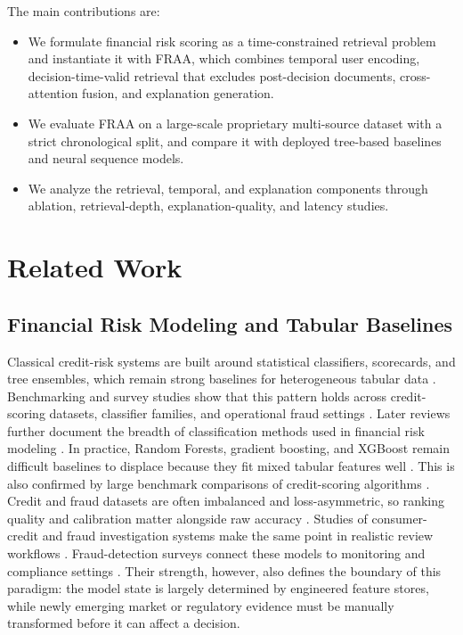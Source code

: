 \documentclass[runningheads]{llncs}
\begin{document}
The main contributions are:
\begin{itemize}
\setlength{\itemsep}{1pt}
\setlength{\topsep}{4pt}
\setlength{\parsep}{0pt}
\setlength{\partopsep}{0pt}
\item[\textendash] We formulate financial risk scoring as a time-constrained retrieval problem and instantiate it with FRAA, which combines temporal user encoding, decision-time-valid retrieval that excludes post-decision documents, cross-attention fusion, and explanation generation.
\item[\textendash] We evaluate FRAA on a large-scale proprietary multi-source dataset with a strict chronological split, and compare it with deployed tree-based baselines and neural sequence models.
\item[\textendash] We analyze the retrieval, temporal, and explanation components through ablation, retrieval-depth, explanation-quality, and latency studies.
\end{itemize}

\section{Related Work}

\subsection{Financial Risk Modeling and Tabular Baselines}
Classical credit-risk systems are built around statistical classifiers, scorecards, and tree ensembles, which remain strong baselines for heterogeneous tabular data \cite{hand1997statistical,thomas2000survey}. Benchmarking and survey studies show that this pattern holds across credit-scoring datasets, classifier families, and operational fraud settings \cite{baesens2003benchmarking,abdou2011credit}. Later reviews further document the breadth of classification methods used in financial risk modeling \cite{louzada2016classification}. In practice, Random Forests, gradient boosting, and XGBoost remain difficult baselines to displace because they fit mixed tabular features well \cite{breiman2001random,friedman2001greedy}. This is also confirmed by large benchmark comparisons of credit-scoring algorithms \cite{chen2016xgboost,lessmann2015benchmarking}. Credit and fraud datasets are often imbalanced and loss-asymmetric, so ranking quality and calibration matter alongside raw accuracy \cite{crook2007recent,brown2012experimental}. Studies of consumer-credit and fraud investigation systems make the same point in realistic review workflows \cite{khandani2010consumer,bellotti2009support}. Fraud-detection surveys connect these models to monitoring and compliance settings \cite{bolton2002statistical,ngai2011application}. Their strength, however, also defines the boundary of this paradigm: the model state is largely determined by engineered feature stores, while newly emerging market or regulatory evidence must be manually transformed before it can affect a decision.
\end{document}
